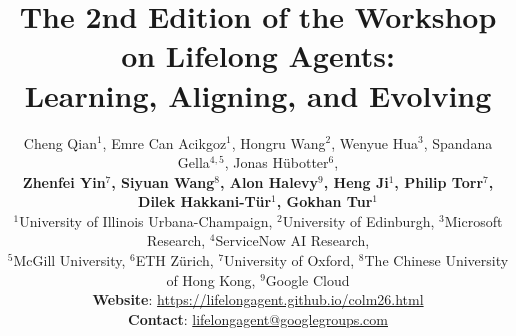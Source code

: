 \title{\vspace{1mm}The 2nd Edition of the Workshop on Lifelong Agents:\\ Learning, Aligning, and Evolving}


\author{Cheng Qian$^{1}$,
Emre Can Acikgoz$^{1}$,
Hongru Wang$^{2}$,
Wenyue Hua$^{3}$,
Spandana Gella$^{4,5}$,
Jonas Hübotter$^{6}$,\\
\textbf{Zhenfei Yin$^{7}$,
Siyuan Wang$^{8}$,
Alon Halevy$^{9}$,
Heng Ji$^{1}$,
Philip Torr$^{7}$,
Dilek Hakkani-T\"ur$^{1}$,
Gokhan Tur$^{1}$
} \vspace{2mm} \\
$^{1}$University of Illinois Urbana-Champaign,
$^{2}$University of Edinburgh,
$^{3}$Microsoft Research,
$^{4}$ServiceNow AI Research,\\
$^{5}$McGill University,
$^{6}$ETH Zürich,
$^{7}$University of Oxford,
$^{8}$The Chinese University of Hong Kong,
$^{9}$Google Cloud \vspace{2mm} \\
\textbf{Website}: \url{https://lifelongagent.github.io/colm26.html} \\
\textbf{Contact}: \url{lifelongagent@googlegroups.com}
}

\newcommand{\fix}{\marginpar{FIX}}
\newcommand{\new}{\marginpar{NEW}}

\iclrfinalcopy %



